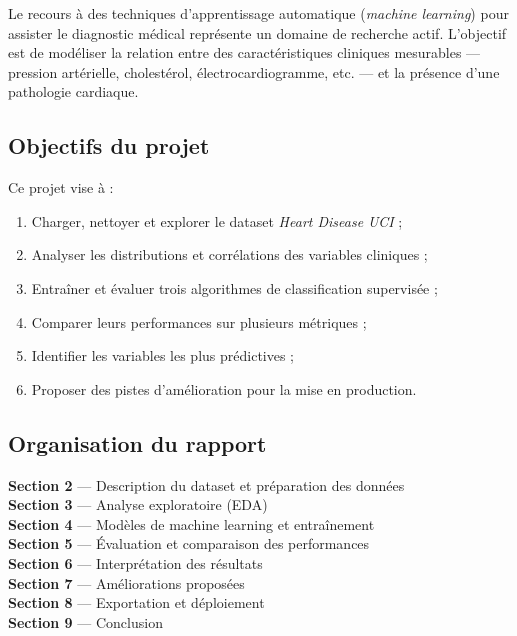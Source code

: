 \documentclass[12pt,a4paper]{article}
\begin{document}
		Le recours à des techniques d'apprentissage automatique (\textit{machine learning}) pour assister le diagnostic médical représente un domaine de recherche actif. L'objectif est de modéliser la relation entre des caractéristiques cliniques mesurables — pression artérielle, cholestérol, électrocardiogramme, etc. — et la présence d'une pathologie cardiaque.

		\subsection{Objectifs du projet}

		Ce projet vise à :
		\begin{enumerate}
		\item Charger, nettoyer et explorer le dataset \textit{Heart Disease UCI} ;
		\item Analyser les distributions et corrélations des variables cliniques ;
		\item Entraîner et évaluer trois algorithmes de classification supervisée ;
		\item Comparer leurs performances sur plusieurs métriques ;
		\item Identifier les variables les plus prédictives ;
		\item Proposer des pistes d'amélioration pour la mise en production.
		\end{enumerate}

		\subsection{Organisation du rapport}

		\begin{tcolorbox}[infobox, title={Structure du rapport}]
			\textbf{Section 2} — Description du dataset et préparation des données \\
			\textbf{Section 3} — Analyse exploratoire (EDA) \\
			\textbf{Section 4} — Modèles de machine learning et entraînement \\
			\textbf{Section 5} — Évaluation et comparaison des performances \\
			\textbf{Section 6} — Interprétation des résultats \\
			\textbf{Section 7} — Améliorations proposées \\
			\textbf{Section 8} — Exportation et déploiement \\
			\textbf{Section 9} — Conclusion
		\end{tcolorbox}
		
\end{document}
